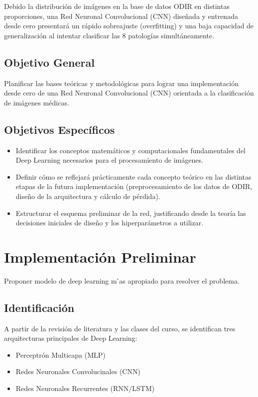 \documentclass[12pt, a4paper]{article}
\begin{document}
Debido la distribución de imágenes en la base de datos ODIR en distintas proporciones, una Red Neuronal Convolucional (CNN) diseñada y entrenada desde cero presentará un rápido sobreajuste (overfitting) y una baja capacidad de generalización al intentar clasificar las 8 patologías simultáneamente.

\subsection{Objetivo General}
Planificar las bases teóricas y metodológicas para lograr una implementación desde cero de una Red Neuronal Convolucional (CNN) orientada a la clasificación de imágenes médicas.
\subsection{Objetivos Específicos}
\begin{itemize}
    \item Identificar los conceptos matemáticos y computacionales fundamentales del Deep Learning necesarios para el procesamiento de imágenes.
    \item Definir cómo se reflejará prácticamente cada concepto teórico en las distintas etapas de la futura implementación (preprocesamiento de los datos de ODIR, diseño de la arquitectura y cálculo de pérdida).
    \item Estructurar el esquema preliminar de la red, justificando desde la teoría las decisiones iniciales de diseño y los hiperparámetros a utilizar.
\end{itemize}

\section{Implementación Preliminar}
Proponer modelo de deep learning m ́as apropiado para resolver el problema.
\subsection{Identificación}

A partir de la revisión de literatura y las clases del curso, se identifican tres arquitecturas principales de Deep Learning: 
\begin{itemize}
    \item Perceptrón Multicapa (MLP)
    \item Redes Neuronales Convolucinales (CNN)
    \item Redes Neuronales Recurrentes (RNN/LSTM)
\end{itemize}
\end{document}
